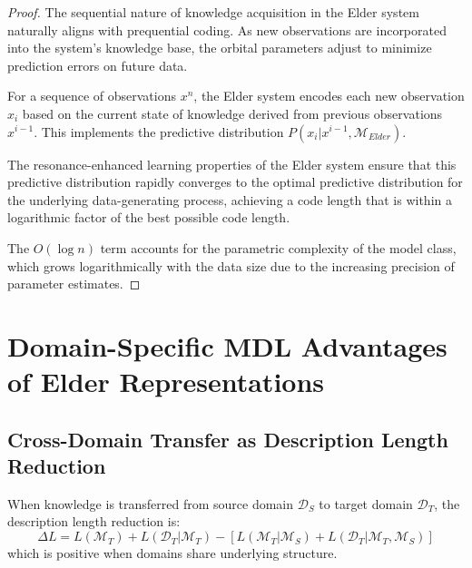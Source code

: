 \begin{proof}
The sequential nature of knowledge acquisition in the Elder system naturally aligns with prequential coding. As new observations are incorporated into the system's knowledge base, the orbital parameters adjust to minimize prediction errors on future data.

For a sequence of observations $x^n$, the Elder system encodes each new observation $x_i$ based on the current state of knowledge derived from previous observations $x^{i-1}$. This implements the predictive distribution $P(x_i | x^{i-1}, \mathcal{M}_{Elder})$.

The resonance-enhanced learning properties of the Elder system ensure that this predictive distribution rapidly converges to the optimal predictive distribution for the underlying data-generating process, achieving a code length that is within a logarithmic factor of the best possible code length.

The $O(\log n)$ term accounts for the parametric complexity of the model class, which grows logarithmically with the data size due to the increasing precision of parameter estimates.
\end{proof}

\section{Domain-Specific MDL Advantages of Elder Representations}

\subsection{Cross-Domain Transfer as Description Length Reduction}

\begin{theorem}
When knowledge is transferred from source domain $\mathcal{D}_S$ to target domain $\mathcal{D}_T$, the description length reduction is:
\begin{equation}
\Delta L = L(\mathcal{M}_T) + L(\mathcal{D}_T | \mathcal{M}_T) - [L(\mathcal{M}_T | \mathcal{M}_S) + L(\mathcal{D}_T | \mathcal{M}_T, \mathcal{M}_S)]
\end{equation}
which is positive when domains share underlying structure.
\end{theorem}

